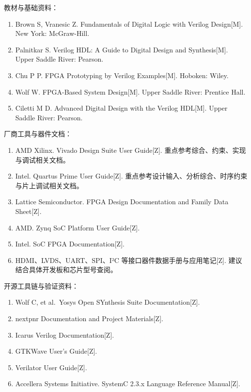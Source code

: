 教材与基础资料：

\begin{enumerate}
\def\labelenumi{\arabic{enumi}.}
\tightlist
\item
  Brown S, Vranesic Z. Fundamentals of Digital Logic with Verilog
  Design{[}M{]}. New York: McGraw-Hill.
\item
  Palnitkar S. Verilog HDL: A Guide to Digital Design and
  Synthesis{[}M{]}. Upper Saddle River: Pearson.
\item
  Chu P P. FPGA Prototyping by Verilog Examples{[}M{]}. Hoboken: Wiley.
\item
  Wolf W. FPGA-Based System Design{[}M{]}. Upper Saddle River: Prentice
  Hall.
\item
  Ciletti M D. Advanced Digital Design with the Verilog HDL{[}M{]}.
  Upper Saddle River: Pearson.
\end{enumerate}

厂商工具与器件文档：

\begin{enumerate}
\def\labelenumi{\arabic{enumi}.}
\tightlist
\item
  AMD Xilinx. Vivado Design Suite User Guide{[}Z{]}.
  重点参考综合、约束、实现与调试相关文档。
\item
  Intel. Quartus Prime User Guide{[}Z{]}.
  重点参考设计输入、分析综合、时序约束与片上调试相关文档。
\item
  Lattice Semiconductor. FPGA Design Documentation and Family Data
  Sheet{[}Z{]}.
\item
  AMD. Zynq SoC Platform User Guide{[}Z{]}.
\item
  Intel. SoC FPGA Documentation{[}Z{]}.
\item
  HDMI、LVDS、UART、SPI、I²C 等接口器件数据手册与应用笔记{[}Z{]}.
  建议结合具体开发板和芯片型号查阅。
\end{enumerate}

开源工具链与验证资料：

\begin{enumerate}
\def\labelenumi{\arabic{enumi}.}
\tightlist
\item
  Wolf C, et al.~Yosys Open SYnthesis Suite Documentation{[}Z{]}.
\item
  nextpnr Documentation and Project Materials{[}Z{]}.
\item
  Icarus Verilog Documentation{[}Z{]}.
\item
  GTKWave User's Guide{[}Z{]}.
\item
  Verilator User Guide{[}Z{]}.
\item
  Accellera Systems Initiative. SystemC 2.3.x Language Reference
  Manual{[}Z{]}.
\end{enumerate}

